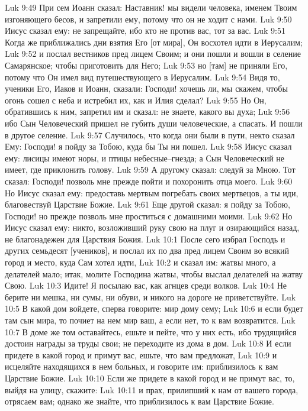 Luk 9:49  При сем Иоанн сказал: Наставник! мы видели человека, именем Твоим изгоняющего бесов, и запретили ему, потому что он не ходит с нами.
Luk 9:50  Иисус сказал ему: не запрещайте, ибо кто не против вас, тот за вас.
Luk 9:51  Когда же приближались дни взятия Его [от мира], Он восхотел идти в Иерусалим;
Luk 9:52  и послал вестников пред лицем Своим; и они пошли и вошли в селение Самарянское; чтобы приготовить для Него;
Luk 9:53  но [там] не приняли Его, потому что Он имел вид путешествующего в Иерусалим.
Luk 9:54  Видя то, ученики Его, Иаков и Иоанн, сказали: Господи! хочешь ли, мы скажем, чтобы огонь сошел с неба и истребил их, как и Илия сделал?
Luk 9:55  Но Он, обратившись к ним, запретил им и сказал: не знаете, какого вы духа;
Luk 9:56  ибо Сын Человеческий пришел не губить души человеческие, а спасать. И пошли в другое селение.
Luk 9:57  Случилось, что когда они были в пути, некто сказал Ему: Господи! я пойду за Тобою, куда бы Ты ни пошел.
Luk 9:58  Иисус сказал ему: лисицы имеют норы, и птицы небесные--гнезда; а Сын Человеческий не имеет, где приклонить голову.
Luk 9:59  А другому сказал: следуй за Мною. Тот сказал: Господи! позволь мне прежде пойти и похоронить отца моего.
Luk 9:60  Но Иисус сказал ему: предоставь мертвым погребать своих мертвецов, а ты иди, благовествуй Царствие Божие.
Luk 9:61  Еще другой сказал: я пойду за Тобою, Господи! но прежде позволь мне проститься с домашними моими.
Luk 9:62  Но Иисус сказал ему: никто, возложивший руку свою на плуг и озирающийся назад, не благонадежен для Царствия Божия.
Luk 10:1  После сего избрал Господь и других семьдесят [учеников], и послал их по два пред лицем Своим во всякий город и место, куда Сам хотел идти,
Luk 10:2  и сказал им: жатвы много, а делателей мало; итак, молите Господина жатвы, чтобы выслал делателей на жатву Свою.
Luk 10:3  Идите! Я посылаю вас, как агнцев среди волков.
Luk 10:4  Не берите ни мешка, ни сумы, ни обуви, и никого на дороге не приветствуйте.
Luk 10:5  В какой дом войдете, сперва говорите: мир дому сему;
Luk 10:6  и если будет там сын мира, то почиет на нем мир ваш, а если нет, то к вам возвратится.
Luk 10:7  В доме же том оставайтесь, ешьте и пейте, что у них есть, ибо трудящийся достоин награды за труды свои; не переходите из дома в дом.
Luk 10:8  И если придете в какой город и примут вас, ешьте, что вам предложат,
Luk 10:9  и исцеляйте находящихся в нем больных, и говорите им: приблизилось к вам Царствие Божие.
Luk 10:10  Если же придете в какой город и не примут вас, то, выйдя на улицу, скажите:
Luk 10:11  и прах, прилипший к нам от вашего города, отрясаем вам; однако же знайте, что приблизилось к вам Царствие Божие.
